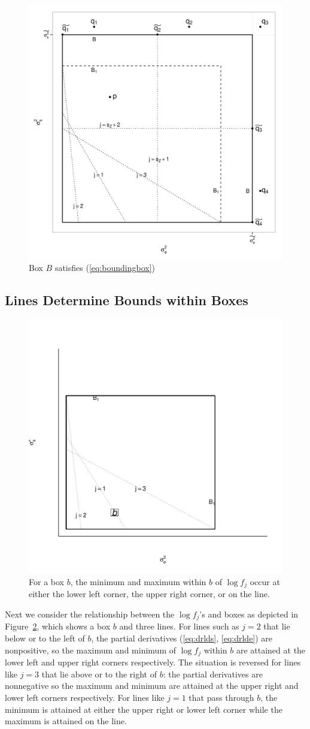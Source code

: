 \documentclass{report}
\newcommand{\RL}{f}
\newcommand{\logRL}{\log\RL}
\begin{document}
\begin{figure}[h]
	\centering
	\includegraphics[width=.5\linewidth]{figs/boundingbox2.pdf}
	\caption{Box $B$ satisfies (\ref{eq:boundingbox})}
	\label{fig:boundingbox2}
\end{figure}

\subsection{Lines Determine Bounds within Boxes}
\begin{figure}
	\centering
	\includegraphics[width=.5\linewidth]{figs/boxb.pdf}
	\caption{For a box $b$,  the minimum and
	maximum within $b$ of $\logRL_j$
	occur at either the lower left corner, the upper right  corner, or
	on the line.
}	\label{fig:boxb}
\end{figure}
Next we consider the relationship between the $\logRL_j$'s and boxes as depicted in Figure~\ref{fig:boxb}, which shows a box $b$ and three lines.  For lines such as $j=2$ that lie below or to the left of $b$, the partial derivatives (\ref{eq:drlds}, \ref{eq:drlde}) are nonpositive, so the maximum and minimum of $\logRL_j$ within $b$ are attained at the lower left and upper right corners respectively.  The situation is reversed for lines like $j=3$ that lie above or to the right of $b$: the partial derivatives are nonnegative so the maximum and minimum are attained at the upper right and lower left corners respectively.  For lines like $j=1$ that pass through $b$, the minimum is attained at either the upper right or lower left corner while the maximum is attained on the line.
\end{document}
